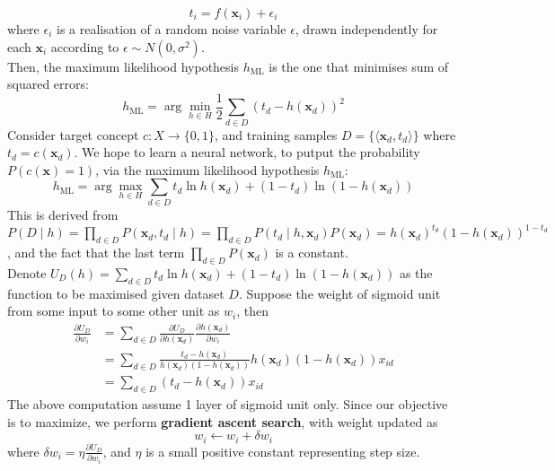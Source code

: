 \documentclass[12pt]{article}
\theoremstyle{definition}
\begin{document}
\[
t_i=f(\mathbf{x}_i)+\epsilon_i
\]
where $\epsilon_i$ is a realisation of a random noise variable $\epsilon$, drawn independently for each $\mathbf{x}_i$ according to $\epsilon\sim N(0, \sigma^2)$.\\
Then, the maximum likelihood hypothesis $h_{\text{ML}}$ is the one that minimises sum of squared errors:
\[
h_{\text{ML}}=\arg\min_{h\in H}\frac{1}{2}\sum_{d\in D}(t_d-h(\mathbf{x}_d))^2
\]
Consider target concept $c:X\to \{0,1\}$, and training samples $D=\{\langle \mathbf{x}_d, t_d\rangle\}$ where $t_d=c(\mathbf{x}_d)$. We hope to learn a neural network, to putput the probability $P(c(\mathbf{x})=1)$, via the maximum likelihood hypothesis $h_{\text{ML}}$:
\[
h_{\text{ML}}=\arg\max_{h\in H} \sum_{d\in D}t_d\ln h(\mathbf{x}_d)+(1-t_d)\ln(1-h(\mathbf{x}_d))
\]
This is derived from $P(D\mid h)=\prod_{d\in D}P(\mathbf{x}_d, t_d\mid h)=\prod_{d\in D}P(t_d\mid h, \mathbf{x}_d)P(\mathbf{x}_d)=h(\mathbf{x}_d)^{{t}_d}(1-h(\mathbf{x}_d))^{1-t_d}$, and the fact that the last term $\prod_{d\in D}P(\mathbf{x}_d)$ is a constant.\\
Denote $U_D(h) = \sum_{d\in D}t_d\ln h(\mathbf{x}_d)+(1-t_d)\ln(1-h(\mathbf{x}_d))$ as the function to be maximised given dataset $D$. Suppose the weight of sigmoid unit from some input to some other unit as $w_i$, then
\begin{align*}
\frac{\partial U_D}{\partial w_i}&=\sum_{d\in D}\frac{\partial U_D}{\partial h(\mathbf{x}_d)}\frac{\partial h(\mathbf{x}_d)}{\partial w_i}\\
&=\sum_{d\in D}\frac{t_d-h(\mathbf{x}_d)}{h(\mathbf{x}_d)(1-h(\mathbf{x}_d))}h(\mathbf{x}_d)(1-h(\mathbf{x}_d))x_{id}\\
&=\sum_{d\in D}(t_d-h(\mathbf{x}_d))x_{id}
\end{align*}
The above computation assume 1 layer of sigmoid unit only. Since our objective is to maximize, we perform \textbf{gradient ascent search}, with weight updated as
\[
w_i\leftarrow w_i+\delta w_i
\]
where $\delta w_i=\eta \frac{\partial U_D}{\partial w_i}$, and $\eta$ is a small positive constant representing step size.\\
\end{document}
